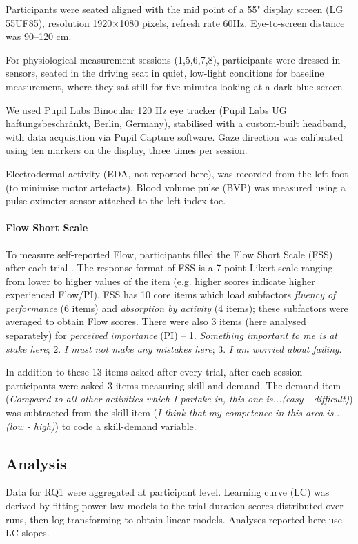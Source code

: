 \documentclass[10pt,letterpaper,floatsintext]{article}
\begin{document}
Participants were seated aligned with the mid point of a 55" display screen (LG 55UF85), resolution 1920$\times$1080 pixels, refresh rate 60Hz. Eye-to-screen distance was 90--120 cm.

For physiological measurement sessions (1,5,6,7,8), participants were dressed in sensors, seated in the driving seat in quiet, low-light conditions for baseline measurement, where they sat still for five minutes looking at a dark blue screen.

We used Pupil Labs Binocular 120 Hz eye tracker (Pupil Labs UG haftungsbeschr\"{a}nkt, Berlin, Germany), stabilised with a custom-built headband, with data acquisition via Pupil Capture software. Gaze direction was calibrated using ten markers on the display, three times per session.

Electrodermal activity (EDA, not reported here),  was recorded from the left foot (to minimise motor artefacts). Blood volume pulse (BVP) was measured using a pulse oximeter sensor attached to the left index toe.

\paragraph{Flow Short Scale} To measure self-reported Flow, participants filled the Flow Short Scale (FSS) after each trial \cite{Cowley2019flow}. The response format of FSS is a 7-point Likert scale ranging from lower to higher values of the item (e.g. higher scores indicate higher experienced Flow/PI). FSS has 10 core items which load subfactors {\it fluency of performance} (6 items) and {\it absorption by activity} (4 items); these subfactors were averaged to obtain Flow scores. There were also 3 items (here analysed separately) for {\it perceived importance} (PI) -- 1. \textit{Something important to me is at stake here}; 2. \textit{I must not make any mistakes here}; 3. \textit{I am worried about failing}.

In addition to these 13 items asked after every trial, after each session participants were asked 3 items measuring skill and demand. The demand item (\textit{Compared to all other activities which I partake in, this one is...(easy - difficult)}) was subtracted from the skill item (\textit{I think that my competence in this area is...(low - high)}) to code a skill-demand variable.


\subsection*{Analysis}
Data for RQ1 were aggregated at participant level. Learning curve (LC) was derived by fitting power-law models to the trial-duration scores distributed over runs, then log-transforming to obtain linear models. Analyses reported here use LC slopes.
\end{document}
